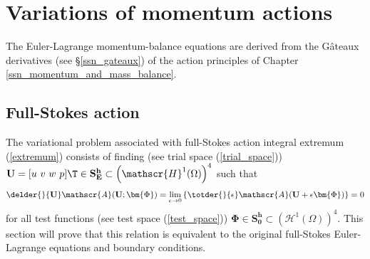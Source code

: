
\chapter{Variations of momentum actions}

The Euler-Lagrange momentum-balance equations are derived from the G\^{a}teaux derivatives (see \S \ref{ssn_gateaux}) of the action principles of Chapter \ref{ssn_momentum_and_mass_balance}.

\section{Full-Stokes action}

The variational problem associated with full-Stokes action integral extremum (\ref{extremum}) consists of finding (see trial space (\ref{trial_space})) $\mathbf{U} = [u\ v\ w\ p]\T \in \mathbf{S_E^h} \subset \left( \mathscr{H}^1(\Omega) \right)^4$ such that
\begin{align}
  \label{full_stokes_var_form_2}
  \delder{}{\mathbf{U}} \mathscr{A}(\mathbf{U}; \bm{\Phi}) = \lim_{\epsilon \rightarrow 0} \left\{ \totder{}{\epsilon} \mathscr{A}(\mathbf{U} + \epsilon \bm{\Phi}) \right\} = 0 
\end{align}
for all test functions (see test space (\ref{test_space})) $\bm{\Phi} \in \mathbf{S_0^h} \subset \left( \mathscr{H}^1(\Omega) \right)^4$.
This section will prove that this relation is equivalent to the original full-Stokes Euler-Lagrange equations and boundary conditions.


